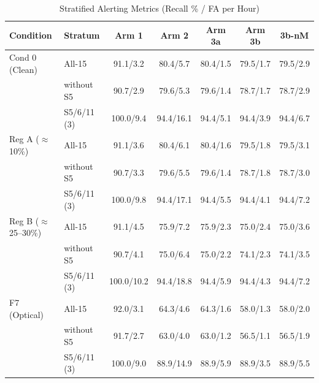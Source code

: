 \begin{table}[t]
\caption{Stratified Alerting Metrics (Recall \% / FA per Hour)}
\label{tab:strata}
\centering
\scriptsize
\setlength{\tabcolsep}{1.8pt}
\begin{tabular}{|l|l|c|c|c|c|c|}
\hline
\textbf{Condition} & \textbf{Stratum} & \textbf{Arm 1} & \textbf{Arm 2} & \textbf{Arm 3a} & \textbf{Arm 3b} & \textbf{3b-nM} \\
\hline
Cond 0 (Clean)   & All-15      & 91.1/3.2 & 80.4/5.7 & 80.4/1.5 & 79.5/1.7 & 79.5/2.9 \\
                 & without S5  & 90.7/2.9 & 79.6/5.3 & 79.6/1.4 & 78.7/1.7 & 78.7/2.9 \\
                 & S5/6/11 (3) & 100.0/9.4 & 94.4/16.1 & 94.4/5.1 & 94.4/3.9 & 94.4/6.7 \\
\hline
Reg A ($\approx$10\%) & All-15      & 91.1/3.6 & 80.4/6.1 & 80.4/1.6 & 79.5/1.8 & 79.5/3.1 \\
                 & without S5  & 90.7/3.3 & 79.6/5.5 & 79.6/1.4 & 78.7/1.8 & 78.7/3.0 \\
                 & S5/6/11 (3) & 100.0/9.8 & 94.4/17.1 & 94.4/5.5 & 94.4/4.1 & 94.4/7.2 \\
\hline
Reg B ($\approx$25--30\%) & All-15      & 91.1/4.5 & 75.9/7.2 & 75.9/2.3 & 75.0/2.4 & 75.0/3.6 \\
                 & without S5  & 90.7/4.1 & 75.0/6.4 & 75.0/2.2 & 74.1/2.3 & 74.1/3.5 \\
                 & S5/6/11 (3) & 100.0/10.2 & 94.4/18.8 & 94.4/5.9 & 94.4/4.3 & 94.4/7.2 \\
\hline
F7 (Optical)     & All-15      & 92.0/3.1 & 64.3/4.6 & 64.3/1.6 & 58.0/1.3 & 58.0/2.0 \\
                 & without S5  & 91.7/2.7 & 63.0/4.0 & 63.0/1.2 & 56.5/1.1 & 56.5/1.9 \\
                 & S5/6/11 (3) & 100.0/9.0 & 88.9/14.9 & 88.9/5.9 & 88.9/3.5 & 88.9/5.5 \\
\hline
\end{tabular}
\end{table}
